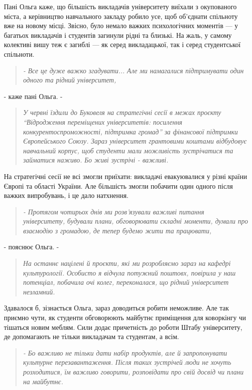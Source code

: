 Пані Ольга каже, що більшість викладачів університету виїхали з окупованого
міста, а керівництво навчального закладу робило усе, щоб об'єднати спільноту
вже на новому місці. Звісно, було немало важких психологічних моментів  — у
багатьох викладачів і студентів загинули рідні та близькі. На жаль, у самому
колективі вишу теж є загиблі — як серед викладацької, так і серед студентської
спільноти. 

\begin{quote}
\em - Все це дуже важко згадувати... Але ми намагалися підтримувати один одного та
рідний університет, 
\end{quote}
- каже пані Ольга. - 
\begin{quote}
\em У червні їздили до Буковеля на
стратегічні сесії в межах проєкту \enquote{Відродження переміщених університетів:
посилення конкурентоспроможності, підтримка громад} за фінансової підтримки
Європейського Союзу.  Зараз університет грантовими коштами відбудовує
навчальний корпус, щоб студенти мали можливість зустрічатися та займатися
наживо. Бо живі зустрічі - важливі.
\end{quote}


На стратегічні сесії не всі змогли приїхати: викладачі евакуювалися у різні
країни Європі та області України. Але більшість змогли побачити один одного
після важких випробувань, і це дало натхнення. 

\begin{quote}
\em - Протягом чотирьох днів ми розв'язували важливі питання університету, будували
плани, обговорювати складні моменти, думали про взаємодію з громадою, де тепер
будемо жити та працювати, 
\end{quote}
- пояснює Ольга. -  
\begin{quote}
\em
На останнє націлені й проєкти, які ми розробляємо зараз на кафедрі
культурології. Особисто я відчула потужний поштовх, повірила у наш
потенціал, побачила очі колег, переконалася, що рідний університет
незламний.
\end{quote}

Здавалося б, зізнається Ольга, зараз доводиться робити неможливе. Але так
приємно чути, як студенти обговорюють майбутнє приміщення для коворкінгу чи
тішаться новим меблям. Сили додає причетність до роботи Штабу університету, де
допомагають не тільки викладачам та студентам, а всім. 

\begin{quote}
\em - Бо важливо не тільки дати набір продуктів, але й запропонувати культурне
перезавантаження. Після таких зустрічей люди не хочуть розходитися, їм важливо
говорити, розповідати про свій досвід чи плани на майбутнє.
\end{quote}

